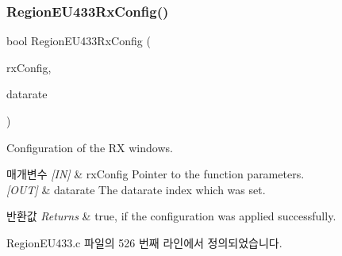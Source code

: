 \subsubsection{\texorpdfstring{Region\+E\+U433\+Rx\+Config()}{RegionEU433RxConfig()}}
{\footnotesize\ttfamily bool Region\+E\+U433\+Rx\+Config (\begin{DoxyParamCaption}\item[{\mbox{\hyperlink{group___r_e_g_i_o_n_ga375c038078dfcfc7ef14280021db719e}{Rx\+Config\+Params\+\_\+t}} $\ast$}]{rx\+Config,  }\item[{int8\+\_\+t $\ast$}]{datarate }\end{DoxyParamCaption})}



Configuration of the RX windows. 


\begin{DoxyParams}{매개변수}
{\em \mbox{[}\+I\+N\mbox{]}} & rx\+Config Pointer to the function parameters.\\
\hline
{\em \mbox{[}\+O\+U\+T\mbox{]}} & datarate The datarate index which was set.\\
\hline
\end{DoxyParams}

\begin{DoxyRetVals}{반환값}
{\em Returns} & true, if the configuration was applied successfully. \\
\hline
\end{DoxyRetVals}


Region\+E\+U433.\+c 파일의 526 번째 라인에서 정의되었습니다.


